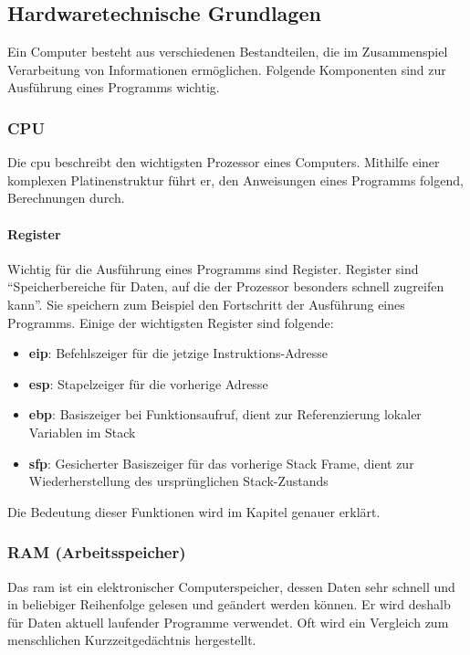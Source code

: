 \documentclass[11pt, a4paper]{article}
\begin{document}
\subsection{Hardwaretechnische Grundlagen}
Ein Computer besteht aus verschiedenen Bestandteilen, die im Zusammenspiel Verarbeitung von Informationen ermöglichen. Folgende Komponenten sind zur Ausführung eines Programms wichtig.
\subsubsection{CPU}\label{subsubsec:cpu}
Die \gls{cpu} beschreibt den wichtigsten Prozessor eines Computers. Mithilfe einer komplexen Platinenstruktur führt er, den Anweisungen eines Programms folgend, Berechnungen durch. 
\paragraph{Register}
Wichtig für die Ausführung eines Programms sind Register. Register sind ``Speicherbereiche für Daten, auf die der Prozessor besonders schnell zugreifen kann''. \cite{RegisterWikipedia:online} Sie speichern zum Beispiel den Fortschritt der Ausführung eines Programms. Einige der wichtigsten Register sind folgende:
\begin{itemize}
	\item \textbf{\gls{eip}}: Befehlszeiger für die jetzige Instruktions-Adresse \cite{UsefulRe7:online}
	\item \textbf{\gls{esp}}: Stapelzeiger für die vorherige Adresse \cite{UsefulRe7:online}
	\item \textbf{\gls{ebp}}: Basiszeiger bei Funktionsaufruf, dient zur Referenzierung lokaler Variablen im Stack \cite{UsefulRe7:online}
	\item \textbf{\gls{sfp}}: Gesicherter Basiszeiger für das vorherige Stack Frame, dient zur Wiederherstellung des ursprünglichen Stack-Zustands \cite{UsefulRe7:online}
\end{itemize}

Die Bedeutung dieser Funktionen wird im Kapitel  genauer erklärt.
\subsubsection{RAM (Arbeitsspeicher)}
Das \gls{ram} ist ein elektronischer Computerspeicher, dessen Daten sehr schnell und in beliebiger Reihenfolge gelesen und geändert werden können. Er wird deshalb für Daten aktuell laufender Programme verwendet. Oft wird ein Vergleich zum menschlichen Kurzzeitgedächtnis hergestellt. 
\end{document}
